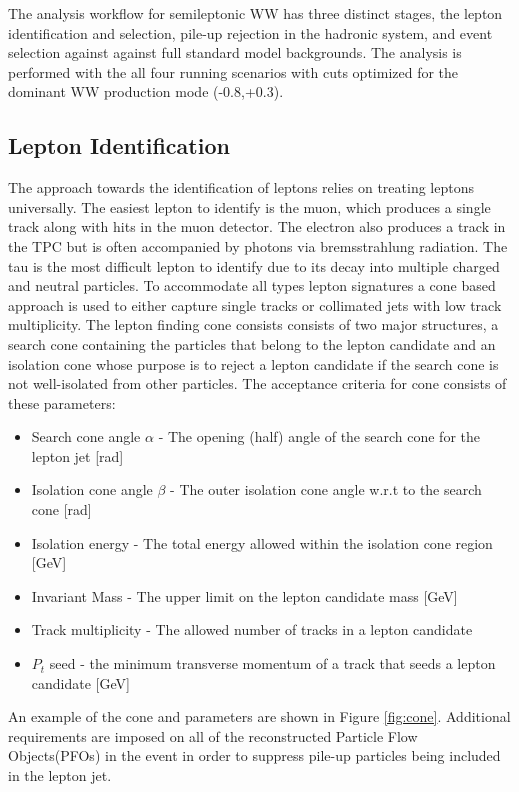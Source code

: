 The analysis workflow for semileptonic WW has three distinct stages, the lepton identification and selection, pile-up rejection in the hadronic system, and event selection against against full standard model backgrounds. The analysis is performed with the all four running scenarios with cuts optimized for the dominant WW production mode (-0.8,+0.3). 


\subsection{Lepton Identification}
\label{subsec:Lepton_ID}
The approach towards the identification of leptons relies on treating leptons universally. The easiest lepton to identify is the muon, which produces a single track along with hits in the muon detector. The electron also produces a track in the TPC but is often accompanied by photons via bremsstrahlung radiation. The tau is the most difficult lepton to identify due to its decay into multiple charged and neutral particles. To accommodate all types lepton signatures a cone based approach is used to either capture single tracks or collimated jets with low track multiplicity. The lepton finding cone consists consists of two major structures, a search cone containing the particles that belong to the lepton candidate and an isolation cone whose purpose is to reject a lepton candidate if the search cone is not well-isolated from other particles. The acceptance criteria for cone consists of these parameters:
\begin{itemize}
\item Search cone angle $\alpha$ - The opening (half) angle of the search cone for the lepton jet [rad]
\item Isolation cone angle $\beta$ - The outer isolation cone angle w.r.t to the search cone [rad]
\item Isolation energy - The total energy allowed within the isolation cone region [GeV]
\item Invariant Mass - The upper limit on the lepton candidate mass [GeV]
\item Track multiplicity - The allowed number of tracks in a lepton candidate
\item $P_t$ seed - the minimum transverse momentum of a track that seeds a lepton candidate [GeV] 
\end{itemize}
An example of the cone and parameters are shown in Figure \ref{fig:cone}. Additional requirements are imposed on all of the reconstructed Particle Flow Objects(PFOs) in the event in order to suppress pile-up particles being included in the lepton jet.
